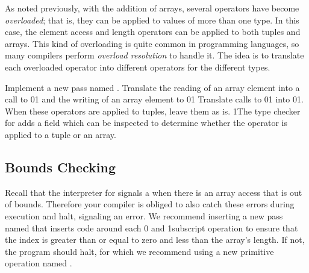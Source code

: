 \documentclass[7x10]{TimesAPriori_MIT}%
\def\racketEd{0}
\def\pythonEd{1}
\def\edition{1}
\newcommand{\racket}[1]{{\if\edition\racketEd{#1}\fi}}
\newcommand{\pythonColor}[0]{}
\newcommand{\python}[1]{{\if\edition\pythonEd\pythonColor #1\fi}}
\numberwithin{theorem}{chapter}
\numberwithin{definition}{chapter}
\numberwithin{equation}{chapter}
\begin{document}
As noted previously, with the addition of arrays, several operators
have become \emph{overloaded}; that is, they can be applied to values
of more than one type. In this case, the element access and length
operators can be applied to both tuples and arrays. This kind of
overloading is quite common in programming languages, so many
compilers perform \emph{overload resolution} to handle it. The idea is to translate each overloaded
operator into different operators for the different types.

Implement a new pass named . 
Translate the reading of an array element
into a call to
\racket{}\python{}
and the writing of an array element to
\racket{}\python{}
Translate calls to \racket{}\python{}
into \racket{}\python{}.
When these operators are applied to tuples, leave them as is.
%
\python{The type checker for \LangArray{} adds a \code{has\_type}
  field which can be inspected to determine whether the operator
  is applied to a tuple or an array.}


\subsection{Bounds Checking}

Recall that the interpreter for \LangArray{} signals a
 when there is an array access that is out of
bounds. Therefore your compiler is obliged to also catch these errors
during execution and halt, signaling an error. We recommend inserting
a new pass named  that inserts code around each
\racket{ and }
\python{subscript} operation to ensure that the index is greater than
or equal to zero and less than the array's length. If not, the program
should halt, for which we recommend using a new primitive operation
named .


\end{document}
